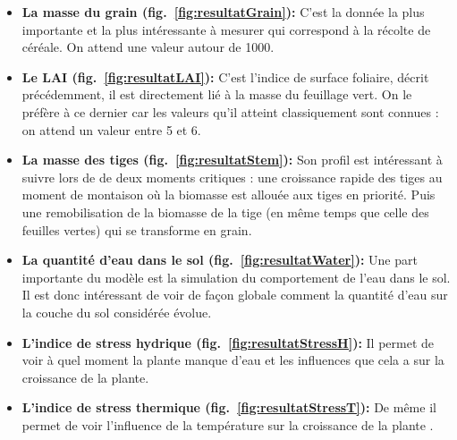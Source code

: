 \begin{itemize}

	\item \textbf{La masse du grain (fig.~\ref{fig:resultatGrain}):} C'est la donnée la plus importante et la plus intéressante à mesurer qui correspond à la récolte de céréale. On attend une valeur autour de 1000.
	
	\item \textbf{Le LAI (fig.~\ref{fig:resultatLAI}):} C'est l'indice de surface foliaire, décrit précédemment, il est directement lié à la masse du feuillage vert. On le préfère à ce dernier car les valeurs qu'il atteint classiquement sont connues : on attend un valeur entre 5 et 6.
	
	\item \textbf{La masse des tiges (fig.~\ref{fig:resultatStem}):} Son profil est intéressant à suivre lors de de deux moments critiques : une croissance rapide des tiges au moment de montaison où la biomasse est allouée aux tiges en priorité. Puis une remobilisation de la biomasse de la tige (en même temps que celle des feuilles vertes) qui se transforme en grain.
	
	\item \textbf{La quantité d'eau dans le sol (fig.~\ref{fig:resultatWater}):} Une part importante du modèle est la simulation du comportement de l'eau dans le sol. Il est donc intéressant de voir de façon globale comment la quantité d'eau sur la couche du sol considérée évolue.
	
	\item \textbf{L'indice de stress hydrique (fig.~\ref{fig:resultatStressH}):} Il permet de voir à quel moment la plante manque d'eau et les influences que cela a sur la croissance de la plante.
	
	\item \textbf{L'indice de stress thermique (fig.~\ref{fig:resultatStressT}):} De même il permet de voir l'influence de la température sur la croissance de la plante .

\end{itemize}

